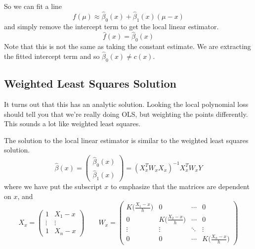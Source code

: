   So we can fit a line 
  \begin{equation}
    f(\mu) \approx \hat{\beta}_0 (x) + \hat{\beta}_1 (x) (\mu - x)
  \end{equation}
  and simply remove the intercept term to get the local linear estimator. 
  \begin{equation}
    \hat{f}(x) = \hat{\beta}_0 (x)
  \end{equation}
  Note that this is not the same as taking the constant estimate. We are extracting the fitted intercept term and so $\hat{\beta}_0(x) \neq c(x)$. 

\subsection{Weighted Least Squares Solution}

  It turns out that this has an analytic solution. Looking the local polynomial loss should tell you that we're really doing OLS, but weighting the points differently. This sounds a lot like weighted least squares. 

  \begin{theorem}
    The solution to the local linear estimator is similar to the weighted least squares solution. 
    \begin{equation}
      \hat{\beta}(x) = \begin{pmatrix} \hat{\beta}_0 (x) \\ \hat{\beta}_1 (x) \end{pmatrix} = (X_x^T W_x X_x)^{-1} X_x^T W_x Y
    \end{equation}
    where we have put the subscript $x$ to emphasize that the matrices are dependent on $x$, and 
    \begin{equation}
      X_x = \begin{pmatrix} 1 & X_1 - x \\ \vdots & \vdots \\ 1 & X_n - x \end{pmatrix} \qquad W_x = \begin{pmatrix} K \big( \frac{X_1 - x}{h} \big) & 0 & \cdots & 0 \\ 0 & K \big( \frac{X_2 - x}{h} \big) & \cdots & 0 \\ \vdots & \vdots & \ddots & \vdots \\ 0 & 0 & \cdots & K \big( \frac{X_n - x}{h} \big) \end{pmatrix}
    \end{equation}
  \end{theorem}

